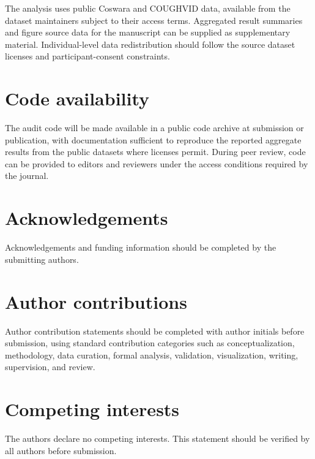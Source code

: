 \documentclass[11pt]{article}
\begin{document}
The analysis uses public Coswara and COUGHVID data, available from the dataset maintainers subject to their access terms. Aggregated result summaries and figure source data for the manuscript can be supplied as supplementary material. Individual-level data redistribution should follow the source dataset licenses and participant-consent constraints.

\section*{Code availability}

The audit code will be made available in a public code archive at submission or publication, with documentation sufficient to reproduce the reported aggregate results from the public datasets where licenses permit. During peer review, code can be provided to editors and reviewers under the access conditions required by the journal.

\section*{Acknowledgements}

Acknowledgements and funding information should be completed by the submitting authors.

\section*{Author contributions}

Author contribution statements should be completed with author initials before submission, using standard contribution categories such as conceptualization, methodology, data curation, formal analysis, validation, visualization, writing, supervision, and review.

\section*{Competing interests}

The authors declare no competing interests. This statement should be verified by all authors before submission.



\end{document}
